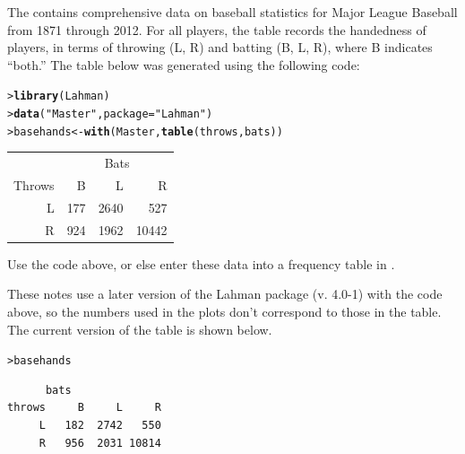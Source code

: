 \documentclass[10pt]{report}\usepackage[]{graphicx}\usepackage[]{color}
\makeatletter
\newcommand{\hlstr}[1]{\textcolor[rgb]{0.192,0.494,0.8}{#1}}%
\newcommand{\hlstd}[1]{\textcolor[rgb]{0.345,0.345,0.345}{#1}}%
\newcommand{\hlkwb}[1]{\textcolor[rgb]{0.69,0.353,0.396}{#1}}%
\newcommand{\hlkwc}[1]{\textcolor[rgb]{0.333,0.667,0.333}{#1}}%
\newcommand{\hlkwd}[1]{\textcolor[rgb]{0.737,0.353,0.396}{\textbf{#1}}}%
\newenvironment{kframe}{%
 \def\at@end@of@kframe{}%
 \ifinner\ifhmode%
  \def\at@end@of@kframe{\end{minipage}}%
  \begin{minipage}{\columnwidth}%
 \fi\fi%
 \def\FrameCommand##1{\hskip\@totalleftmargin \hskip-\fboxsep
 \colorbox{shadecolor}{##1}\hskip-\fboxsep
     \hskip-\linewidth \hskip-\@totalleftmargin \hskip\columnwidth}%
 \MakeFramed {\advance\hsize-\width
   \@totalleftmargin\z@ \linewidth\hsize
   \@setminipage}}%
 {\par\unskip\endMakeFramed%
 \at@end@of@kframe}
\newenvironment{knitrout}{}{} %
\renewenvironment{knitrout}{\small\renewcommand{\baselinestretch}{.85}}{} %
\makeatother
\begin{document}
\begin{Exercises}
\begin{enumerate*}
\begin{ans}
    \end{ans}
    
  \end{enumerate*}

\exercise The  contains comprehensive data on baseball statistics for Major League Baseball from 1871 through 2012.  
For all players, the  table records the handedness of players, in terms of
throwing (L, R) and batting (B, L, R), where B indicates ``both.''
The table below was generated using the following code:
\begin{knitrout}\footnotesize
{}\color{fgcolor}\begin{kframe}
\begin{alltt}
\hlstd{> }\hlkwd{library}\hlstd{(Lahman)}
\hlstd{> }\hlkwd{data}\hlstd{(}\hlstr{"Master"}\hlstd{,} \hlkwc{package} \hlstd{=} \hlstr{"Lahman"}\hlstd{)}
\hlstd{> }\hlstd{basehands} \hlkwb{<-} \hlkwd{with}\hlstd{(Master,} \hlkwd{table}\hlstd{(throws, bats))}
\end{alltt}
\end{kframe}
\end{knitrout}


\begin{table}[ht]
\centering
\begin{tabular}{r|rrr}
  \hline
       & \multicolumn{3}{c}{Bats} \\
Throws & B & L & R \\ 
  \hline
  L & 177 & 2640 & 527 \\ 
  R & 924 & 1962 & 10442 \\ 
   \hline
\end{tabular}
\end{table}
  \begin{itemize*}
    \item Use the code above, or else enter these data into a frequency table in \R.
    \begin{ans}
    These notes use a later version of the Lahman package (v. 4.0-1) with the code above, so the numbers used in the plots
    don't correspond to those in the table.  The current version of the table is shown below.
\begin{knitrout}\footnotesize
{}\color{fgcolor}\begin{kframe}
\begin{alltt}
\hlstd{> }\hlstd{basehands}
\end{alltt}
\begin{verbatim}
      bats
throws     B     L     R
     L   182  2742   550
     R   956  2031 10814
\end{verbatim}
\end{kframe}
\end{knitrout}
    \end{ans}
    

\end{itemize*}
\end{Exercises}
\end{document}
